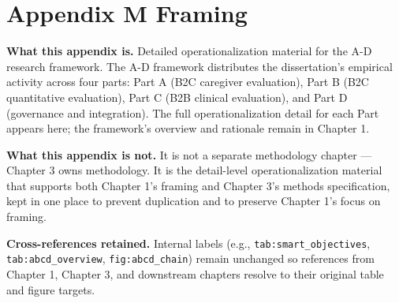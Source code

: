 
\section*{Appendix M Framing}
\label{sec:appm_framing}

\noindent\textbf{What this appendix is.} Detailed operationalization material for
the A-D research framework. The A-D framework distributes the dissertation's
empirical activity across four parts: Part A (B2C caregiver evaluation), Part B
(B2C quantitative evaluation), Part C (B2B clinical evaluation), and Part D
(governance and integration). The full operationalization detail for each Part
appears here; the framework's overview and rationale remain in Chapter 1.

\noindent\textbf{What this appendix is not.} It is not a separate methodology
chapter — Chapter 3 owns methodology. It is the detail-level operationalization
material that supports both Chapter 1's framing and Chapter 3's methods
specification, kept in one place to prevent duplication and to preserve
Chapter 1's focus on framing.

\noindent\textbf{Cross-references retained.} Internal labels (e.g., \texttt{tab:smart\_\allowbreak objectives},
\texttt{tab:abcd\_\allowbreak overview}, \texttt{fig:abcd\_\allowbreak chain}) remain unchanged so references
from Chapter 1, Chapter 3, and downstream chapters resolve to their original
table and figure targets.

